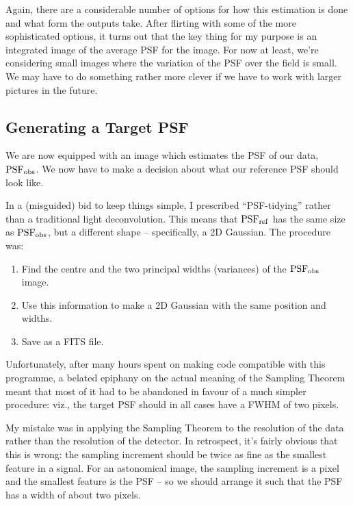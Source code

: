 \documentclass[letterpaper, 11pt]{article}
\def\psfobs{\ensuremath{{\rm PSF_{obs}}}\xspace}
\def\psfref{\ensuremath{{\rm PSF_{ref}}}\xspace}
\begin{document}
Again, there are a considerable number of options for how this estimation is done and what form the outputs take. After flirting with some of the more sophisticated options, it turns out that the key thing for my purpose is an integrated image of the average PSF for the image. For now at least, we're considering small images where the variation of the PSF over the field is small. We may have to do something rather more clever if we have to work with larger pictures in the future.


\subsection{Generating a Target PSF}

We are now equipped with an image which estimates the PSF of our data, \psfobs. We now have to make a decision about what our reference PSF should look like.

In a (misguided) bid to keep things simple, I prescribed ``PSF-tidying'' rather than a traditional light deconvolution. This means that \psfref has the same size as \psfobs, but a different shape -- specifically, a 2D Gaussian. The procedure was:
\begin{enumerate}
	\item Find the centre and the two principal widths (variances) of the \psfobs image.
	\item Use this information to make a 2D Gaussian with the same position and widths.
	\item Save as a FITS file.
\end{enumerate}

Unfortunately, after many hours spent on making code compatible with this programme, a belated epiphany on the actual meaning of the Sampling Theorem meant that most of it had to be abandoned in favour of a much simpler procedure: viz., the target PSF should in all cases have a FWHM of two pixels.

My mistake was in applying the Sampling Theorem to the resolution of the data rather than the resolution of the detector. In retrospect, it's fairly obvious that this is wrong: the sampling increment should be twice as fine as the smallest feature in a signal. For an astonomical image, the sampling increment is a pixel and the smallest feature is the PSF -- so we should arrange it such that the PSF has a width of about two pixels.
\end{document}
